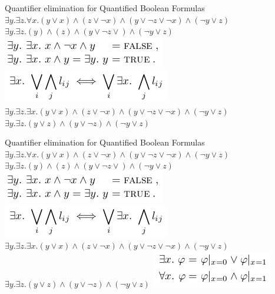 \documentclass{beamer}
\begin{document}
\begin{frame}{Quantifier elimination for Quantified Boolean Formulas}
$\exists y.\exists z.\forall x.(y\vee x)\wedge(z\vee\lnot x) \wedge (y \vee \lnot z \vee \lnot x) \wedge (\lnot y \vee z)$\newline
$\exists y.\exists z.(y)\wedge(z) \wedge (y \vee \lnot z\vee) \wedge (\lnot y \vee z)$\newline
\includegraphics[scale=0.5]{elem_qbf1.png}\newline
\includegraphics[scale=0.5]{elem_qbf2.png}\newline
$\exists y.\exists z.\exists x.(y\vee x)\wedge(z\vee\lnot x) \wedge (y \vee \lnot z \vee \lnot x) \wedge (\lnot y \vee z)$\newline
$\exists y.\exists z.(y\vee z)\wedge (y \vee \lnot z) \wedge (\lnot y \vee z)$\newline
\end{frame}

\begin{frame}{Quantifier elimination for Quantified Boolean Formulas}
$\exists y.\exists z.\forall x.(y\vee x)\wedge(z\vee\lnot x) \wedge (y \vee \lnot z \vee \lnot x) \wedge (\lnot y \vee z)$\newline
$\exists y.\exists z.(y)\wedge(z) \wedge (y \vee \lnot z\vee) \wedge (\lnot y \vee z)$\newline
\includegraphics[scale=0.5]{elem_qbf1.png}\newline
\includegraphics[scale=0.5]{elem_qbf2.png}\newline
$\exists y.\exists z.\exists x.(y\vee x)\wedge(z\vee\lnot x) \wedge (y \vee \lnot z \vee \lnot x) \wedge (\lnot y \vee z)$\newline
$\exists y.\exists z.(y\vee z)\wedge (y \vee \lnot z) \wedge (\lnot y \vee z)$\newline
\includegraphics[scale=0.5]{expansion_based.png}
\end{frame}
\end{document}
